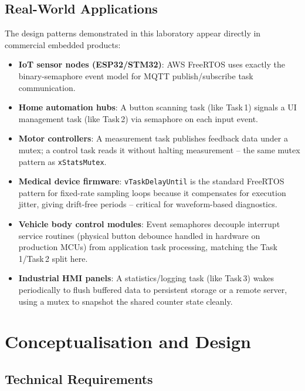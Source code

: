 \documentclass[12pt]{article}
\begin{document}
\subsection{Real-World Applications}
\hspace{0.8cm} The design patterns demonstrated in this laboratory appear directly in commercial embedded products:

\begin{itemize}
    \item \textbf{IoT sensor nodes (ESP32/STM32)}: AWS FreeRTOS uses exactly the binary-semaphore event model for MQTT publish/subscribe task communication.
    \item \textbf{Home automation hubs}: A button scanning task (like Task\,1) signals a UI management task (like Task\,2) via semaphore on each input event.
    \item \textbf{Motor controllers}: A measurement task publishes feedback data under a mutex; a control task reads it without halting measurement -- the same mutex pattern as \texttt{xStatsMutex}.
    \item \textbf{Medical device firmware}: \texttt{vTaskDelayUntil} is the standard FreeRTOS pattern for fixed-rate sampling loops because it compensates for execution jitter, giving drift-free periods -- critical for waveform-based diagnostics.
    \item \textbf{Vehicle body control modules}: Event semaphores decouple interrupt service routines (physical button debounce handled in hardware on production MCUs) from application task processing, matching the Task\,1/Task\,2 split here.
    \item \textbf{Industrial HMI panels}: A statistics/logging task (like Task\,3) wakes periodically to flush buffered data to persistent storage or a remote server, using a mutex to snapshot the shared counter state cleanly.
\end{itemize}

\section{Conceptualisation and Design}

\subsection{Technical Requirements}
\end{document}
